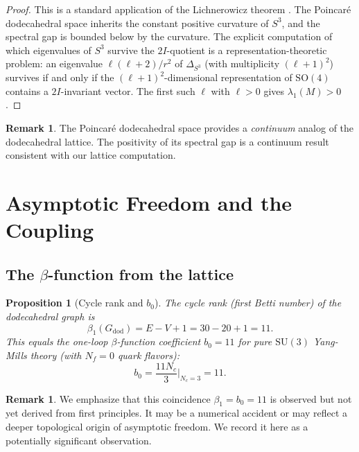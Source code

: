 \documentclass[12pt,a4paper]{article}
\newtheorem{proposition}[theorem]{Proposition}
\theoremstyle{definition}
\newtheorem{remark}[theorem]{Remark}
\theoremstyle{remark}
\newcommand{\SU}{\mathrm{SU}}
\newcommand{\SO}{\mathrm{SO}}
\begin{document}
\begin{proof}
This is a standard application of the Lichnerowicz theorem
\cite{lichnerowicz1958}.  The Poincar\'{e} dodecahedral space inherits
the constant positive curvature of $S^3$, and the spectral gap is
bounded below by the curvature.  The explicit computation of which
eigenvalues of $S^3$ survive the $2I$-quotient is a representation-theoretic
problem: an eigenvalue $\ell(\ell+2)/r^2$ of $\Delta_{S^3}$
(with multiplicity $(\ell+1)^2$) survives if and only if the
$(\ell+1)^2$-dimensional representation of $\SO(4)$ contains a
$2I$-invariant vector.  The first such $\ell$ with $\ell > 0$
gives $\lambda_1(M) > 0$.
\end{proof}

\begin{remark}
The Poincar\'{e} dodecahedral space provides a \emph{continuum}
analog of the dodecahedral lattice.  The positivity of its spectral
gap is a continuum result consistent with our lattice computation.
\end{remark}

\section{Asymptotic Freedom and the Coupling}\label{sec:asymptotic}

\subsection{The $\beta$-function from the lattice}\label{ssec:beta}

\begin{proposition}[Cycle rank and $b_0$]\label{prop:b0}
The cycle rank (first Betti number) of the dodecahedral graph is
\begin{equation}\label{eq:cyclerank}
  \beta_1(G_{\mathrm{dod}}) = E - V + 1 = 30 - 20 + 1 = 11.
\end{equation}
This equals the one-loop $\beta$-function coefficient $b_0 = 11$
for pure $\SU(3)$ Yang-Mills theory (with $N_f = 0$ quark flavors):
\[
  b_0 = \frac{11 N_c}{3}\Big|_{N_c = 3} = 11.
\]
\end{proposition}

\begin{remark}
We emphasize that this coincidence $\beta_1 = b_0 = 11$ is observed but
not yet derived from first principles.  It may be a numerical accident or
may reflect a deeper topological origin of asymptotic freedom.  We record it
here as a potentially significant observation.
\end{remark}
\end{document}
